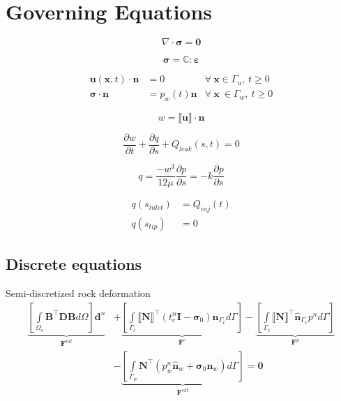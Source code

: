 \documentclass{article}
\begin{document}
\section{Governing Equations}

\begin{equation}
\nabla \cdot \boldsymbol\sigma = \mathbf{0}
\end{equation}

\begin{equation}
\boldsymbol \sigma = \mathbb{C} \colon \boldsymbol \varepsilon 
\end{equation}

\begin{align}
\mathbf{u}(\mathbf{x},t)\cdot \mathbf{n} &= 0 &\forall \: \mathbf{x} \in \Gamma_u, \: t \geq 0
\\
\boldsymbol\sigma \cdot \mathbf{n} &= p_w(t)\mathbf{n} &\forall \: \mathbf{x} \: \in \Gamma_w, \: t \geq 0
\end{align}

\begin{equation}
w = \llbracket \mathbf{u}\rrbracket \cdot \mathbf{n}
\end{equation}

\begin{equation}
\dfrac{\partial w}{\partial t} + \dfrac{\partial q}{\partial s} + Q_{leak}(s, t) = 0
\end{equation}

\begin{equation}
q = \dfrac{-w^3}{12\mu}\dfrac{\partial p}{\partial s} 
= -k \dfrac{\partial p}{\partial s}
\end{equation}

\begin{align}
q(s_{inlet}) &= Q_{inj}(t)
\\
q(s_{tip}) &= 0
\end{align}

\subsection{Discrete equations}
Semi-discretized rock deformation	
\begin{equation}
\label{eqn:solid-discrete}
\begin{aligned}
\underbrace{\left[\int\limits_{\Omega_s} \mathbf{B}^{\top} \mathbf{D} \mathbf{B} d\Omega \right] \mathbf{d}^n}_{\mathbf{F}^{int}}
&+ 
\underbrace{
	\left[\int\limits_{\Gamma_{c}} \llbracket \mathbf{N} \rrbracket ^{\top} \left(t_c^n \mathbf{I} - \boldsymbol\sigma_0 \right) \hat{\mathbf{n}}_{\Gamma_c} d\Gamma \right]	
}_{\mathbf{F}^{c}}
- 
\underbrace{\left[\int\limits_{\Gamma_{c}} \llbracket \mathbf{N} \rrbracket ^{\top} \hat{\mathbf{n}}_{\Gamma_c} p^n d\Gamma \right] 
	 }_{\mathbf{F}^{p}}
\\
&- 
\underbrace{\left[\int\limits_{\Gamma_w} \mathbf{N}^{\top} \left( p_w^n \hat{\mathbf{n}}_{w} + \boldsymbol\sigma_0\hat{\mathbf{n}}_{w} \right) d\Gamma \right]}_{\mathbf{F}^{ext}}
= \mathbf{0}
\end{aligned}
\end{equation}
\end{document}
